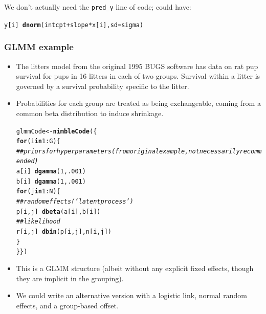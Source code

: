 \documentclass{beamer}\usepackage[]{graphicx}\usepackage[]{color}
\makeatletter
\newcommand{\hlnum}[1]{\textcolor[rgb]{0.686,0.059,0.569}{#1}}%
\newcommand{\hlcom}[1]{\textcolor[rgb]{0.678,0.584,0.686}{\textit{#1}}}%
\newcommand{\hlopt}[1]{\textcolor[rgb]{0,0,0}{#1}}%
\newcommand{\hlstd}[1]{\textcolor[rgb]{0.345,0.345,0.345}{#1}}%
\newcommand{\hlkwa}[1]{\textcolor[rgb]{0.161,0.373,0.58}{\textbf{#1}}}%
\newcommand{\hlkwb}[1]{\textcolor[rgb]{0.69,0.353,0.396}{#1}}%
\newcommand{\hlkwc}[1]{\textcolor[rgb]{0.333,0.667,0.333}{#1}}%
\newcommand{\hlkwd}[1]{\textcolor[rgb]{0.737,0.353,0.396}{\textbf{#1}}}%
\newenvironment{kframe}{%
 \def\at@end@of@kframe{}%
 \ifinner\ifhmode%
  \def\at@end@of@kframe{\end{minipage}}%
  \begin{minipage}{\columnwidth}%
 \fi\fi%
 \def\FrameCommand##1{\hskip\@totalleftmargin \hskip-\fboxsep
 \colorbox{shadecolor}{##1}\hskip-\fboxsep
     \hskip-\linewidth \hskip-\@totalleftmargin \hskip\columnwidth}%
 \MakeFramed {\advance\hsize-\width
   \@totalleftmargin\z@ \linewidth\hsize
   \@setminipage}}%
 {\par\unskip\endMakeFramed%
 \at@end@of@kframe}
\newenvironment{knitrout}{}{} %
\makeatother
\begin{document}
\begin{frame}[fragile]
We don't actually need the \texttt{pred\_y} line of code; could have:
\begin{knitrout}\scriptsize
{}\color{fgcolor}\begin{kframe}
\begin{alltt}
\hlstd{y[i]} \hlopt{~} \hlkwd{dnorm}\hlstd{(intcpt} \hlopt{+} \hlstd{slope} \hlopt{*} \hlstd{x[i],} \hlkwc{sd} \hlstd{= sigma)}
\end{alltt}
\end{kframe}
\end{knitrout}

\end{frame}

\begin{frame}[fragile] 
\sffamily
\frametitle{GLMM example}

{\footnotesize
\begin{itemize}
\item The litters model from the original 1995 BUGS software has data on rat pup survival for pups in 16 litters in each of two groups.  Survival within a litter is governed by a survival probability specific to the litter.
\item Probabilities for each group are treated as being exchangeable, coming from a common beta distribution to induce shrinkage. 

\begin{knitrout}\tiny
{}\color{fgcolor}\begin{kframe}
\begin{alltt}
\hlstd{glmmCode} \hlkwb{<-} \hlkwd{nimbleCode}\hlstd{(\{}
  \hlkwa{for} \hlstd{(i} \hlkwa{in} \hlnum{1}\hlopt{:}\hlstd{G) \{}
      \hlcom{## priors for hyperparameters (from original example, not necessarily recommended)}
     \hlstd{a[i]} \hlopt{~} \hlkwd{dgamma}\hlstd{(}\hlnum{1}\hlstd{,} \hlnum{.001}\hlstd{)}
     \hlstd{b[i]} \hlopt{~} \hlkwd{dgamma}\hlstd{(}\hlnum{1}\hlstd{,} \hlnum{.001}\hlstd{)}
     \hlkwa{for} \hlstd{(j} \hlkwa{in} \hlnum{1}\hlopt{:}\hlstd{N) \{}
        \hlcom{## random effects ('latent process')}
        \hlstd{p[i,j]} \hlopt{~} \hlkwd{dbeta}\hlstd{(a[i], b[i])}
        \hlcom{## likelihood }
        \hlstd{r[i,j]} \hlopt{~} \hlkwd{dbin}\hlstd{(p[i,j], n[i,j])}
     \hlstd{\}}
   \hlstd{\}          \})}
\end{alltt}
\end{kframe}
\end{knitrout}

\item This is a GLMM structure (albeit without any explicit fixed effects, though they are implicit in the grouping).
\item We could write an alternative version with a logistic link, normal random effects, and a group-based offset.
\end{itemize}
}
\end{frame}
\end{document}
